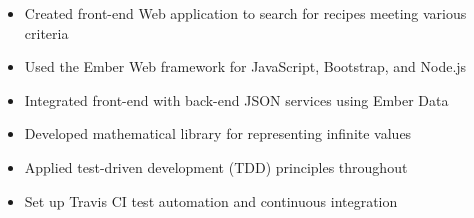 \documentclass[10pt]{article}
\begin{document}

	\begin{itemize}
		\item Created front-end Web application to search for recipes meeting various criteria
		\item Used the Ember Web framework for JavaScript, Bootstrap, and Node.js
		\item Integrated front-end with back-end JSON services using Ember Data
	\end{itemize}


	\begin{itemize}
		\item Developed mathematical library for representing infinite values
		\item Applied test-driven development (TDD) principles throughout
		\item Set up Travis CI test automation and continuous integration
	\end{itemize}
\end{document}
